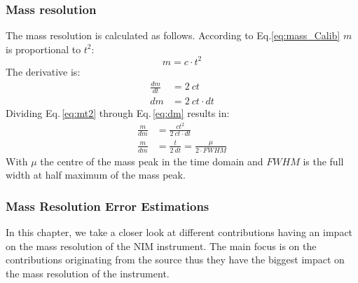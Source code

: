 	
	\subsubsection{Mass resolution} %
	The mass resolution is calculated as follows. According to Eq.\ref{eq:mass_Calib} $m$ is proportional to $t^2$:
	\begin{equation}
		m = c\cdot t^2
		\label{eq:mt2}
	\end{equation}
	The derivative is:
	\begin{align}
		\frac{dm}{dt} &= 2~ct\\
		dm &= 2~ct\cdot dt
		\label{eq:dm}
	\end{align}
	Dividing Eq.\,\eqref{eq:mt2} through Eq.\,\eqref{eq:dm} results in:
	\begin{align}
		\frac{m}{dm} &= \frac{ct^2}{2~ct\cdot dt}\\
		\frac{m}{dm} &= \frac{t}{2~dt} = \frac{\mu}{2\cdot FWHM}
		\label{eq:massRes}
	\end{align}
	With $\mu$ the centre of the mass peak in the time domain and $FWHM$ is the full width at half maximum of the mass peak.
		
	\subsubsection{Mass Resolution Error Estimations} %
	In this chapter, we take a closer look at different contributions having an impact on the mass resolution of the NIM instrument. The main focus is on the contributions originating from the source thus they have the biggest impact on the mass resolution of the instrument.\\
	
